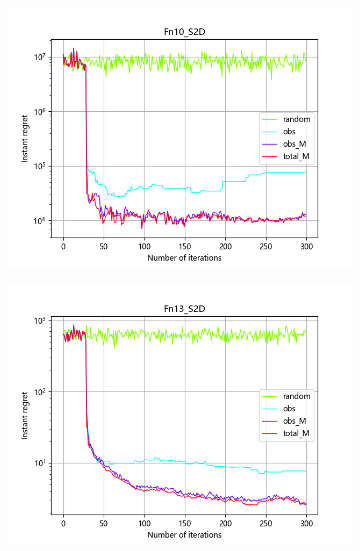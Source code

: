 \documentclass{article}
\begin{document}
\begin{figure}[H]
\begin{subfigure}[t]{.32\linewidth}
        \includegraphics[width=1\textwidth]{pictures/Homo_noise_2D/S/Fn10_S2D_ins.png}
    \end{subfigure}
    \begin{subfigure}[t]{.32\linewidth}
        \centering
        \includegraphics[width=1\textwidth]{pictures/Homo_noise_2D/S/Fn13_S2D_ins.png}
    \end{subfigure}
    \begin{subfigure}[t]{.32\linewidth}
        \centering

\end{subfigure}
\end{figure}
\end{document}

